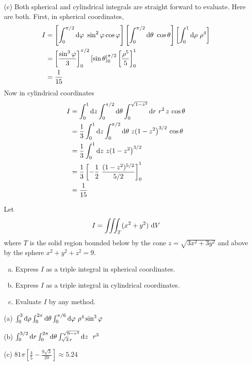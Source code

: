 \begin{solution}
\begin{itemize}
 (c)
Both spherical and cylindrical integrals are straight forward to evaluate.
Here are both. First, in spherical coordinates,
\begin{align*}
I&=  \left[\int_0^{\pi/2}\dee{\varphi}\ \sin^2\varphi\cos\varphi\right]
    \left[\int_0^{\pi/2}\dee{\theta}\ \cos\theta\right]
     \left[\int_0^1\dee{\rho}\ \rho^4\right] \\
 &=\left[\frac{\sin^3\varphi}{3}\right]_0^{\pi/2}
    \left[\sin\theta\right]_0^{\pi/2}
     \left[\frac{\rho^5}{5}\right]_0^1 \\
 &=\frac{1}{15}
\end{align*}
Now in cylindrical coordinates
\begin{align*}
I&=\int_0^1\dee{z}\int_0^{\pi/2}\dee{\theta}\int_0^{\sqrt{1-z^2}}\dee{r} \ 
         r^2\,z\,\cos\theta \\
&=\frac{1}{3}\int_0^1\dee{z}\int_0^{\pi/2}\dee{\theta}\ z{(1-z^2\big)}^{3/2}\,
            \cos\theta \\
&=\frac{1}{3}\int_0^1\dee{z}\ z{(1-z^2\big)}^{3/2} \\
&=\frac{1}{3}\left[-\frac{1}{2}\ \frac{(1-z^2)^{5/2}}{5/2}\right]_0^1\\
&=\frac{1}{15}
\end{align*}

\end{itemize}
\end{solution}


\begin{question}[M200 2010A] %
Let
\begin{equation*}
I = \tripInt_T  (x^2+y^2)\ \dee{V}
\end{equation*}
where $T$ is the solid region bounded below by the cone 
$z =\sqrt{3x^2+3y^2}$ and above by the sphere
$x^2 + y^2 + z^2 = 9$.
\begin{enumerate}[(a)]
\item
Express $I$ as a triple integral in spherical coordinates.
\item
Express $I$ as a triple integral in cylindrical coordinates.
\item
Evaluate $I$ by any method.
\end{enumerate}
\end{question}

%

\begin{answer}
(a) $\int_0^{3}\mathrm{d}\rho\int_0^{2\pi}\mathrm{d}\theta
           \int_0^{\pi/6}\mathrm{d}\varphi\ \rho^4\sin^3\varphi$

(b) $\int_0^{3/2}\dee{r}\int_0^{2\pi}\dee{\theta}
                          \int_{\sqrt{3}\,r}^{\sqrt{9-r^2}}\dee{z}\ \ r^3$

(c) $81\pi \left[\frac{4}{5} - \frac{9\sqrt{3}}{20}\right]
     \approx 5.24$
\end{answer}

